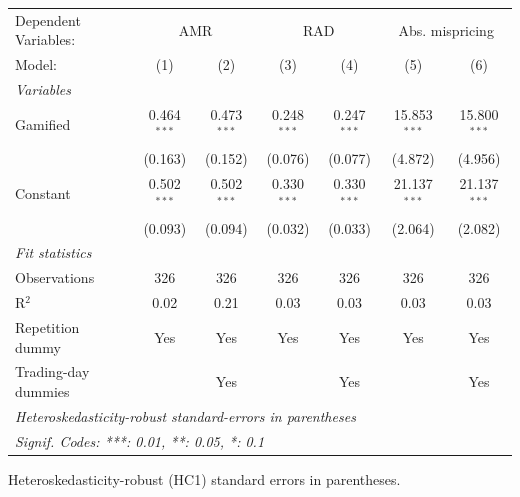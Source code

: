 \begingroup
\centering
\begin{tabular}{lcccccc}
   \tabularnewline \midrule \midrule
   Dependent Variables: & \multicolumn{2}{c}{AMR} & \multicolumn{2}{c}{RAD} & \multicolumn{2}{c}{Abs. mispricing}\\
   Model:              & (1)           & (2)           & (3)           & (4)           & (5)            & (6)\\  
   \midrule
   \emph{Variables}\\
   Gamified            & 0.464$^{***}$ & 0.473$^{***}$ & 0.248$^{***}$ & 0.247$^{***}$ & 15.853$^{***}$ & 15.800$^{***}$\\   
                       & (0.163)       & (0.152)       & (0.076)       & (0.077)       & (4.872)        & (4.956)\\   
   Constant            & 0.502$^{***}$ & 0.502$^{***}$ & 0.330$^{***}$ & 0.330$^{***}$ & 21.137$^{***}$ & 21.137$^{***}$\\   
                       & (0.093)       & (0.094)       & (0.032)       & (0.033)       & (2.064)        & (2.082)\\   
   \midrule
   \emph{Fit statistics}\\
   Observations        & 326           & 326           & 326           & 326           & 326            & 326\\  
   R$^2$               & 0.02          & 0.21          & 0.03          & 0.03          & 0.03           & 0.03\\  
   Repetition dummy    & Yes           & Yes           & Yes           & Yes           & Yes            & Yes\\  
   Trading-day dummies &               & Yes           &               & Yes           &                & Yes\\  
   \midrule \midrule
   \multicolumn{7}{l}{\emph{Heteroskedasticity-robust standard-errors in parentheses}}\\
   \multicolumn{7}{l}{\emph{Signif. Codes: ***: 0.01, **: 0.05, *: 0.1}}\\
\end{tabular}
 
\par \raggedright 
Heteroskedasticity-robust (HC1) standard errors in parentheses.
\par\endgroup
